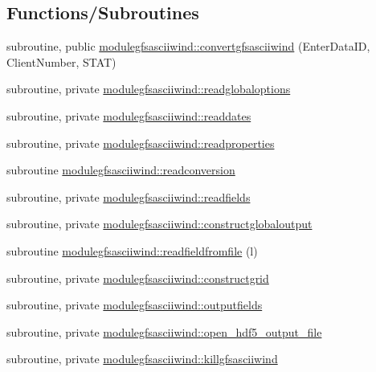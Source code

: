 \subsection*{Functions/\+Subroutines}
\begin{DoxyCompactItemize}
\item 
subroutine, public \mbox{\hyperlink{namespacemodulegfsasciiwind_a4a4a0dde4375b81a03f64232de2622c5}{modulegfsasciiwind\+::convertgfsasciiwind}} (Enter\+Data\+ID, Client\+Number, S\+T\+AT)
\item 
subroutine, private \mbox{\hyperlink{namespacemodulegfsasciiwind_a8c3d7b7c4a1b9cba9c41386d4584b037}{modulegfsasciiwind\+::readglobaloptions}}
\item 
subroutine, private \mbox{\hyperlink{namespacemodulegfsasciiwind_ab9051f99673c32b2f6b1020ab37aa9c1}{modulegfsasciiwind\+::readdates}}
\item 
subroutine, private \mbox{\hyperlink{namespacemodulegfsasciiwind_a59e80d4f0ead06a644744e644d4504a0}{modulegfsasciiwind\+::readproperties}}
\item 
subroutine \mbox{\hyperlink{namespacemodulegfsasciiwind_a2ae7830d5f79fbdaea50e4f86eef0d4b}{modulegfsasciiwind\+::readconversion}}
\item 
subroutine, private \mbox{\hyperlink{namespacemodulegfsasciiwind_ac5d334e8c6ff65db3f44823f9a106515}{modulegfsasciiwind\+::readfields}}
\item 
subroutine, private \mbox{\hyperlink{namespacemodulegfsasciiwind_a138e1d55d83fe4bc5ba1901ae3adcbb7}{modulegfsasciiwind\+::constructglobaloutput}}
\item 
subroutine \mbox{\hyperlink{namespacemodulegfsasciiwind_a69fe620e0a4b751e1ee827c3e8f01e6c}{modulegfsasciiwind\+::readfieldfromfile}} (l)
\item 
subroutine, private \mbox{\hyperlink{namespacemodulegfsasciiwind_a794951032db573702ba8cfba3fe3f55b}{modulegfsasciiwind\+::constructgrid}}
\item 
subroutine, private \mbox{\hyperlink{namespacemodulegfsasciiwind_ab51247b85cb09b0446fe50076953724a}{modulegfsasciiwind\+::outputfields}}
\item 
subroutine, private \mbox{\hyperlink{namespacemodulegfsasciiwind_ac0e8ece9bfc11aa5ca290d333ad96a29}{modulegfsasciiwind\+::open\+\_\+hdf5\+\_\+output\+\_\+file}}
\item 
subroutine, private \mbox{\hyperlink{namespacemodulegfsasciiwind_af8a728ba2b355e73d4c07f7d2a55c500}{modulegfsasciiwind\+::killgfsasciiwind}}
\end{DoxyCompactItemize}
